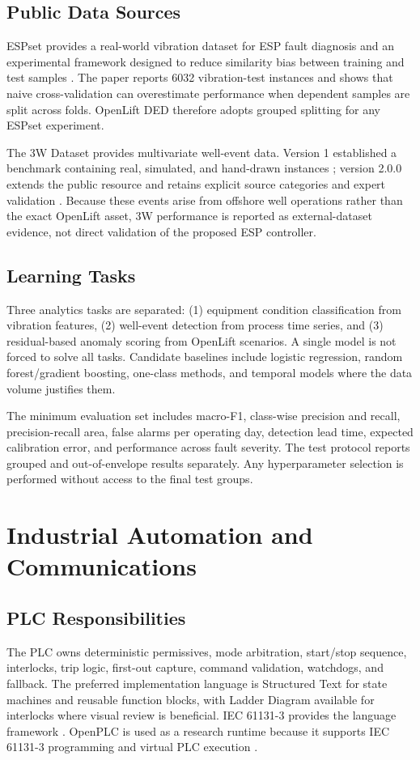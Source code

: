 \documentclass[conference]{IEEEtran}
\begin{document}
\subsection{Public Data Sources}
ESPset provides a real-world vibration dataset for ESP fault diagnosis and an experimental framework designed to reduce similarity bias between training and test samples \cite{varejao2024}. The paper reports 6032 vibration-test instances and shows that naive cross-validation can overestimate performance when dependent samples are split across folds. OpenLift DED therefore adopts grouped splitting for any ESPset experiment.

The 3W Dataset provides multivariate well-event data. Version 1 established a benchmark containing real, simulated, and hand-drawn instances \cite{vargas2019}; version 2.0.0 extends the public resource and retains explicit source categories and expert validation \cite{vargas2026}. Because these events arise from offshore well operations rather than the exact OpenLift asset, 3W performance is reported as external-dataset evidence, not direct validation of the proposed ESP controller.

\subsection{Learning Tasks}
Three analytics tasks are separated: (1) equipment condition classification from vibration features, (2) well-event detection from process time series, and (3) residual-based anomaly scoring from OpenLift scenarios. A single model is not forced to solve all tasks. Candidate baselines include logistic regression, random forest/gradient boosting, one-class methods, and temporal models where the data volume justifies them.

The minimum evaluation set includes macro-F1, class-wise precision and recall, precision-recall area, false alarms per operating day, detection lead time, expected calibration error, and performance across fault severity. The test protocol reports grouped and out-of-envelope results separately. Any hyperparameter selection is performed without access to the final test groups.

\section{Industrial Automation and Communications}
\subsection{PLC Responsibilities}
The PLC owns deterministic permissives, mode arbitration, start/stop sequence, interlocks, trip logic, first-out capture, command validation, watchdogs, and fallback. The preferred implementation language is Structured Text for state machines and reusable function blocks, with Ladder Diagram available for interlocks where visual review is beneficial. IEC 61131-3 provides the language framework \cite{iec61131}. OpenPLC is used as a research runtime because it supports IEC 61131-3 programming and virtual PLC execution \cite{openplc}.
\end{document}
